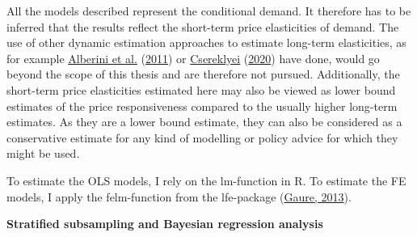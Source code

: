 \documentclass[12pt,twoside]{reedthesis}
\begin{document}
All the models described represent the conditional demand. It therefore has to be inferred that the results reflect the short-term price elasticities of demand. The use of other dynamic estimation approaches to estimate long-term elasticities, as for example \protect\hyperlink{ref-alberini_etal11}{Alberini et al.} (\protect\hyperlink{ref-alberini_etal11}{2011}) or \protect\hyperlink{ref-csereklyei20}{Csereklyei} (\protect\hyperlink{ref-csereklyei20}{2020}) have done, would go beyond the scope of this thesis and are therefore not pursued. Additionally, the short-term price elasticities estimated here may also be viewed as lower bound estimates of the price responsiveness compared to the usually higher long-term estimates. As they are a lower bound estimate, they can also be considered as a conservative estimate for any kind of modelling or policy advice for which they might be used.

To estimate the OLS models, I rely on the lm-function in R. To estimate the FE models, I apply the felm-function from the lfe-package (\protect\hyperlink{ref-gaure2013lfe}{Gaure, 2013}).

\textbf{Stratified subsampling and Bayesian regression analysis}
\end{document}
